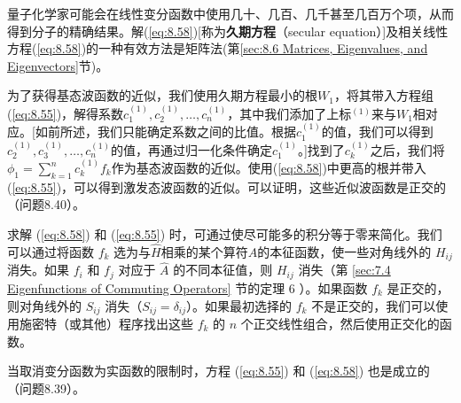     量子化学家可能会在线性变分函数中使用几十、几百、几千甚至几百万个项，从而得到分子的精确结果。解(\ref{eq:8.58})[称为\textbf{久期方程}（secular equation）]及相关线性方程(\ref{eq:8.58})的一种有效方法是矩阵法(第\ref{sec:8.6 Matrices, Eigenvalues, and Eigenvectors}节)。

    为了获得基态波函数的近似，我们使用久期方程最小的根$W_1$，将其带入方程组(\ref{eq:8.55})，解得系数$c_1^{\left(1\right)}, c_2^{\left(1\right)}, \ldots, c_n^{\left(1\right)}$，其中我们添加了上标$^{(1)}$来与$W_1$相对应。[如前所述，我们只能确定系数之间的比值。根据$c_1^{\left(1\right)}$的值，我们可以得到$c_2^{\left(1\right)}, c_3^{\left(1\right)}, \ldots, c_n^{\left(1\right)}$的值，再通过归一化条件确定$c_1^{\left(1\right)}$。]找到了$c_k^{\left(1\right)}$之后，我们将$\phi_1 = \sum_{k=1}^{n}c_k^{\left(1\right)}f_k$作为基态波函数的近似。使用(\ref{eq:8.58})中更高的根并带入(\ref{eq:8.55})，可以得到激发态波函数的近似。可以证明，这些近似波函数是正交的（问题8.40）。

    求解 (\ref{eq:8.58}) 和 (\ref{eq:8.55}) 时，可通过使尽可能多的积分等于零来简化。我们可以通过将函数 $f_k$ 选为与$\hat{H}$相乘的某个算符$\hat{A}$的本征函数，使一些对角线外的 $H_{ij}$ 消失。如果 $f_i$ 和 $f_j$ 对应于 $\hat{A}$ 的不同本征值，则 $H_{ij}$ 消失（第 \ref{sec:7.4 Eigenfunctions of Commuting Operators} 节的定理 6 ）。如果函数 $f_k$ 是正交的，则对角线外的 $S_{ij}$ 消失（$S_{ij} = \delta_{ij}$）。如果最初选择的 $f_k$ 不是正交的，我们可以使用施密特（或其他）程序找出这些 $f_k$ 的 $n$ 个正交线性组合，然后使用正交化的函数。

    当取消变分函数为实函数的限制时，方程 (\ref{eq:8.55}) 和 (\ref{eq:8.58}) 也是成立的（问题8.39）。

